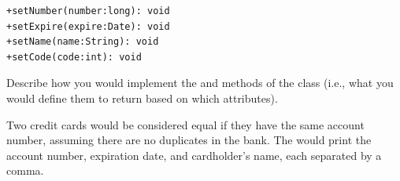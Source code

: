 \begin{answer}[6em]
\begin{verbatim}
+setNumber(number:long): void
+setExpire(expire:Date): void
+setName(name:String): void
+setCode(code:int): void
\end{verbatim}
\end{answer}


\Q Describe how you would implement the  and  methods of the  class (i.e., what you would define them to return based on which attributes).

\begin{answer}[5em]
Two credit cards would be considered equal if they have the same account number, assuming there are no duplicates in the bank.
The  would print the account number, expiration date, and cardholder's name, each separated by a comma.
\end{answer}
